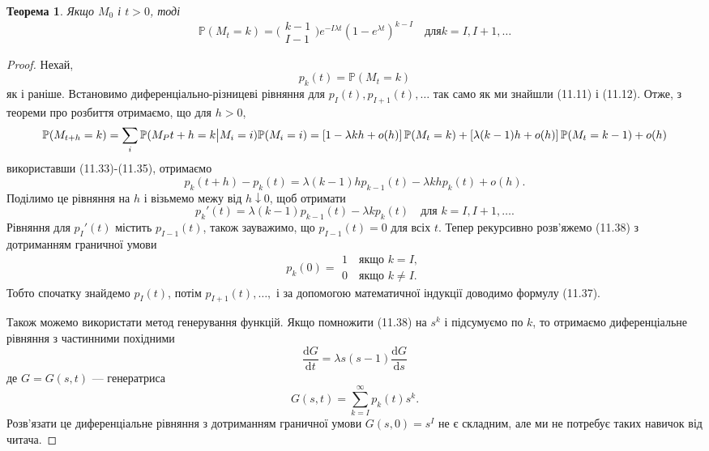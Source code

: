 \documentclass[12pt,fleqn]{article}
\newtheorem{theorem}{Теорема}[section]
\numberwithin{figure}{section}
\numberwithin{equation}{section}
\begin{document}
\begin{theorem}
  Якщо $M_0$ і $t>0$, тоді
  \begin{equation}\label{11.37}
    \mathbb{P}(M_t=k) = \bigg(\begin{matrix}
                          k-1 \\
                          I-1
                        \end{matrix}\bigg) e^{-I\lambda t}(1-e^{\lambda t})^{k-I}\quad \text{для} k=I, I+1, \dots
  \end{equation}
\end{theorem}

\begin{proof}
  Нехай,
  $$p_k(t)=\mathbb{P}(M_t=k)$$
  як і раніше. Встановимо диференціально-різницеві рівняння для $p_I(t), p_{I+1}(t), \dots$ так само як ми знайшли (11.11) і (11.12). Отже, з теореми про розбиття отримаємо, що для $h>0$,
  \[\mathbb{P}(M_{t+h}=k)=\sum_{i}\mathbb{P}(M_P{t+h}=k\big|M_i=i)\mathbb{P}(M_i=i)
     \\ =\left[1-\lambda kh +o(h)\right]\mathbb{P}(M_t=k)+\left[\lambda(k-1)h+o(h)\right]\mathbb{P}(M_t=k-1)+o(h)\]
  використавши (11.33)-(11.35), отримаємо
  \[p_k(t+h)-p_k(t)=\lambda(k-1)hp_{k-1}(t)-\lambda khp_k(t) + o(h). \]
  Поділимо це рівняння на $h$ і візьмемо межу від $h\downarrow0$, щоб отримати 
  \[p_{k}'(t)=\lambda(k-1)p_{k-1}(t)-\lambda kp_k(t) \quad \text{для } k=I, I+1, \dots.\]
  Рівняння для $p_{I}'(t)$ містить $p_{I-1}(t)$, також зауважимо, що $p_{I-1}(t)=0$ для всіх $t$. Тепер рекурсивно розв'яжемо (11.38) з дотриманням граничної умови 
  \begin{equation}\label{11.39}
  p_{k}(0)=\begin{matrix}
             1 \quad \text{якщо } k=I, \\
             0 \quad \text{якщо } k\neq I.
           \end{matrix}
  \end{equation}
  Тобто спочатку знайдемо $p_{I}(t)$, потім $p_{I+1}(t), \dots,$ і за допомогою математичної індукції доводимо формулу (11.37).
  
  Також можемо використати метод генерування функцій. Якщо помножити (11.38) на $s^k$ і підсумуємо по $k$, то отримаємо диференціальне рівняння з частинними похідними
  \begin{equation}\label{11.40}
    \frac{\mathrm{d}G}{\mathrm{d}t}=\lambda s(s-1)\frac{\mathrm{d}G}{\mathrm{d}s}
  \end{equation}
  де $G=G(s, t)$ --- генератриса
  $$G(s,t)=\sum_{k=I}^{\infty}p_k(t)s^k.$$
  Розв'язати це диференціальне рівняння з дотриманням граничної умови $G(s,0)=s^I$ не є складним, але ми не потребує таких навичок від читача.
\end{proof}
\end{document}
